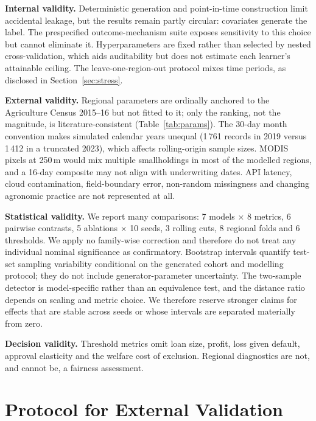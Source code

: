 \documentclass[journal]{IEEEtran}
\begin{document}
\textbf{Internal validity.} Deterministic generation and point-in-time construction limit accidental leakage, but the results remain partly circular: covariates generate the label. The prespecified outcome-mechanism suite exposes sensitivity to this choice but cannot eliminate it. Hyperparameters are fixed rather than selected by nested cross-validation, which aids auditability but does not estimate each learner's attainable ceiling. The leave-one-region-out protocol mixes time periods, as disclosed in Section~\ref{sec:stress}.

\textbf{External validity.} Regional parameters are ordinally anchored to the Agriculture Census 2015--16 \cite{agcensus2016} but not fitted to it; only the ranking, not the magnitude, is literature-consistent (Table~\ref{tab:params}). The 30-day month convention makes simulated calendar years unequal (1\,761 records in 2019 versus 1\,412 in a truncated 2023), which affects rolling-origin sample sizes. MODIS pixels at 250\,m would mix multiple smallholdings in most of the modelled regions, and a 16-day composite may not align with underwriting dates. API latency, cloud contamination, field-boundary error, non-random missingness and changing agronomic practice are not represented at all.

\textbf{Statistical validity.} We report many comparisons: 7 models $\times$ 8 metrics, 6 pairwise contrasts, 5 ablations $\times$ 10 seeds, 3 rolling cuts, 8 regional folds and 6 thresholds. We apply no family-wise correction and therefore do not treat any individual nominal significance as confirmatory. Bootstrap intervals quantify test-set sampling variability conditional on the generated cohort and modelling protocol; they do not include generator-parameter uncertainty. The two-sample detector is model-specific rather than an equivalence test, and the distance ratio depends on scaling and metric choice. We therefore reserve stronger claims for effects that are stable across seeds or whose intervals are separated materially from zero.

\textbf{Decision validity.} Threshold metrics omit loan size, profit, loss given default, approval elasticity and the welfare cost of exclusion. Regional diagnostics are not, and cannot be, a fairness assessment.

\section{Protocol for External Validation}
\end{document}
